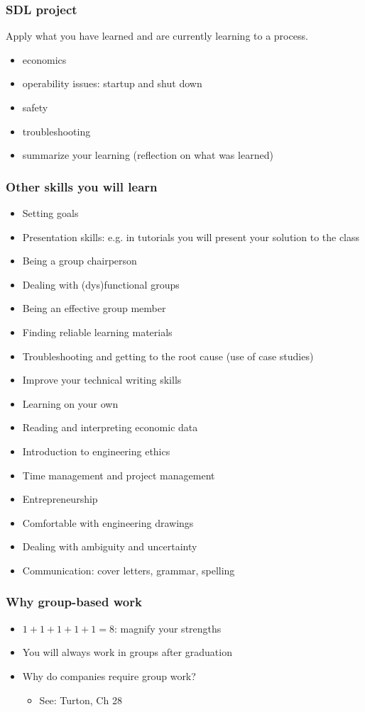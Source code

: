 \begin{frame}\frametitle{SDL project}
	Apply what you have learned and are currently learning to a process.
	\vspace{12pt}
	\begin{itemize}
		\item	economics
		\item	operability issues: startup and shut down
		\item	safety
		\item	troubleshooting
		\item	summarize your learning (reflection on what was learned)
	\end{itemize}
\end{frame}

\begin{frame}\frametitle{Other skills you will learn}
	\begin{itemize}
		\item	Setting goals
		\item	Presentation skills: e.g. in tutorials you will present your solution to the class
		\item	Being a group chairperson
		\item	Dealing with (dys)functional groups
		\item	Being an effective group member
		\item	Finding reliable learning materials
		\item	Troubleshooting and getting to the root cause {\scriptsize (use of case studies)}
		\item	Improve your technical writing skills
		\item	Learning on your own
		\item	Reading and interpreting economic data
		\item	Introduction to engineering ethics
		\item	Time management and project management
		\item	Entrepreneurship
		\item	Comfortable with engineering drawings
		\item	Dealing with ambiguity and uncertainty		
		\item	Communication: cover letters, grammar, spelling
	\end{itemize}	
\end{frame}

\begin{frame}\frametitle{Why group-based work}
	\begin{itemize}
		\item	$1+1+1+1+1 = 8$: magnify your strengths
		\item	You will always work in groups after graduation
		\item	Why do companies require group work?
		\begin{itemize}
			\item	See: Turton, Ch 28
		\end{itemize}	
	\end{itemize}
\end{frame}

